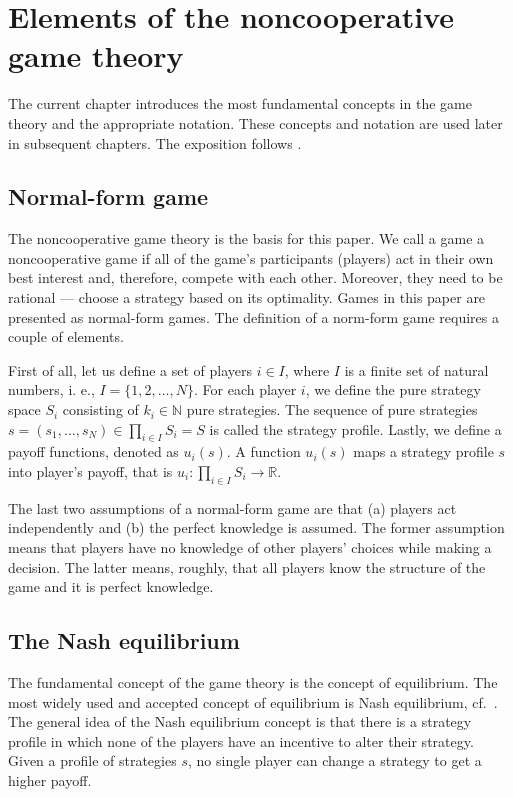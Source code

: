 \documentclass[english, twoside, 12pt, a4paper]{article}
\theoremstyle{definition}
\theoremstyle{plain}
\theoremstyle{remark}
\newcommand{\setn}{\mathbb{N}}
\begin{document}
\section{Elements of the noncooperative game theory}\label{sec:gt}

The current chapter introduces the most fundamental concepts in the game theory and the appropriate notation. These concepts and notation are used later in subsequent chapters. The exposition follows \cite{fudenberg1991game,gibbons1992game}.

\subsection{Normal-form game}

The noncooperative game theory is the basis for this paper. We call a game a noncooperative game if all of the game's participants (players) act in their own best interest and, therefore, compete with each other. Moreover, they need to be rational --- choose a strategy based on its optimality. Games in this paper are presented as normal-form games. The definition of a norm-form game requires a couple of elements. 

First of all, let us define a set of players $i \in I$, where $I$ is a finite set of natural numbers, i. e., $I = \{1, 2, \ldots, N\}$. For each player $i$, we define the pure strategy space $S_i$ consisting of $k_i \in \setn$ pure strategies. The sequence of pure strategies $s = \left(s_1, \ldots, s_N \right) \in \prod_{i \in I} S_i = S$ is called the strategy profile. Lastly, we define a payoff functions, denoted as $u_i(s)$. A function \(u_i (s)\) maps a strategy profile \(s\) into player's payoff, that is $u_i: \prod_{i \in I}S_i \rightarrow \mathbb{R}$.

The last two assumptions of a normal-form game are that (a) players act independently and (b) the perfect knowledge is assumed. The former assumption means that players have no knowledge of other players' choices while making a decision. The latter means, roughly, that all players know the structure of the game and it is perfect knowledge.

\subsection{The Nash equilibrium}

The fundamental concept of the game theory is the concept of equilibrium. The most widely used and accepted concept of equilibrium is Nash equilibrium, cf.~\cite{nash1951non}. The general idea of the Nash equilibrium concept is that there is a strategy profile in which none of the players have an incentive to alter their strategy. Given a profile of strategies \(s\), no single player can change a strategy to get a higher payoff.
\end{document}
